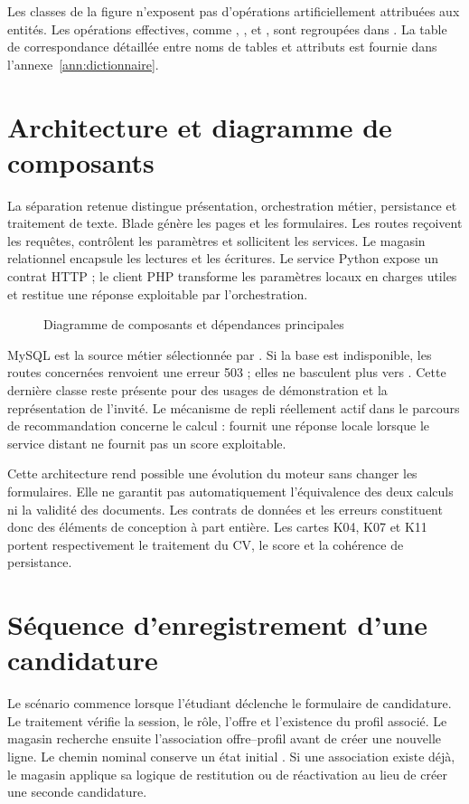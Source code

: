 Les classes de la figure n'exposent pas d'opérations artificiellement attribuées aux entités. Les opérations effectives, comme , ,  et , sont regroupées dans . La table de correspondance détaillée entre noms de tables et attributs est fournie dans l'annexe~\ref{ann:dictionnaire}.

\section{Architecture et diagramme de composants}
La séparation retenue distingue présentation, orchestration métier, persistance et traitement de texte. Blade génère les pages et les formulaires. Les routes reçoivent les requêtes, contrôlent les paramètres et sollicitent les services. Le magasin relationnel encapsule les lectures et les écritures. Le service Python expose un contrat HTTP ; le client PHP transforme les paramètres locaux en charges utiles et restitue une réponse exploitable par l'orchestration.

\begin{figure}[H]\centering
\resizebox{\textwidth}{!}{}
\caption{Diagramme de composants et dépendances principales}
\label{fig:uml-composants}\end{figure}

MySQL est la source métier sélectionnée par . Si la base est indisponible, les routes concernées renvoient une erreur 503 ; elles ne basculent plus vers . Cette dernière classe reste présente pour des usages de démonstration et la représentation de l'invité. Le mécanisme de repli réellement actif dans le parcours de recommandation concerne le calcul :  fournit une réponse locale lorsque le service distant ne fournit pas un score exploitable.

Cette architecture rend possible une évolution du moteur sans changer les formulaires. Elle ne garantit pas automatiquement l'équivalence des deux calculs ni la validité des documents. Les contrats de données et les erreurs constituent donc des éléments de conception à part entière. Les cartes K04, K07 et K11 portent respectivement le traitement du CV, le score et la cohérence de persistance.

\section{Séquence d'enregistrement d'une candidature}
Le scénario commence lorsque l'étudiant déclenche le formulaire de candidature. Le traitement vérifie la session, le rôle, l'offre et l'existence du profil associé. Le magasin recherche ensuite l'association offre--profil avant de créer une nouvelle ligne. Le chemin nominal conserve un état initial . Si une association existe déjà, le magasin applique sa logique de restitution ou de réactivation au lieu de créer une seconde candidature.

